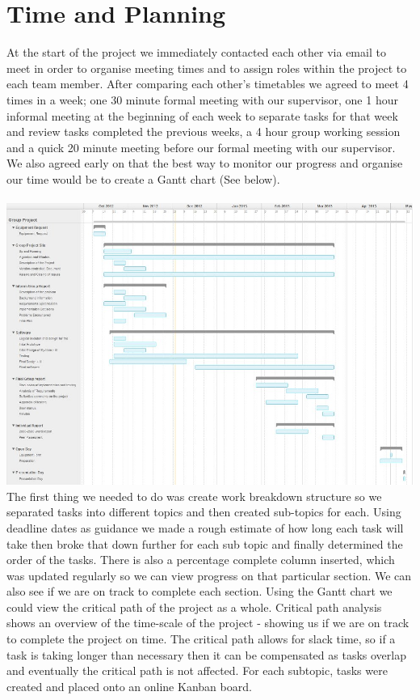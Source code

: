 \documentclass[10pt,a4paper]{article}
\begin{document}
\section{Time and Planning}
At the start of the project we immediately contacted each other via email to meet in order to organise meeting times and to assign roles within the project to each team member. After comparing each other's timetables we agreed to meet 4 times in a week; one 30 minute formal meeting with our supervisor, one 1 hour informal meeting at the beginning of each week to separate tasks for that week and review tasks completed the previous weeks, a 4 hour group working session and a quick 20 minute meeting before our formal meeting with our supervisor. We also agreed early on that the best way to monitor our progress and organise our time would be to create a Gantt chart (See below). \\
\\
\includegraphics[scale=0.7, angle=270]{gantt.png}
\pagebreak
The first thing we needed to do was create work breakdown structure so we separated tasks into different topics and then created sub-topics for each. Using deadline dates as guidance we made a rough estimate of how long each task will take then broke that down further for each sub topic and finally determined the order of the tasks. There is also a percentage complete column inserted, which was updated regularly so we can view progress on that particular section. We can also see if we are on track to complete each section. Using the Gantt chart we could view the critical path of the project as a whole. Critical path analysis shows an overview of the time-scale of the project - showing us if we are on track to complete the project on time. The critical path allows for slack time, so if a task is taking longer than necessary then it can be compensated as tasks overlap and eventually the critical path is not affected. For each subtopic, tasks were created and placed onto an online Kanban board.\\
\end{document}
